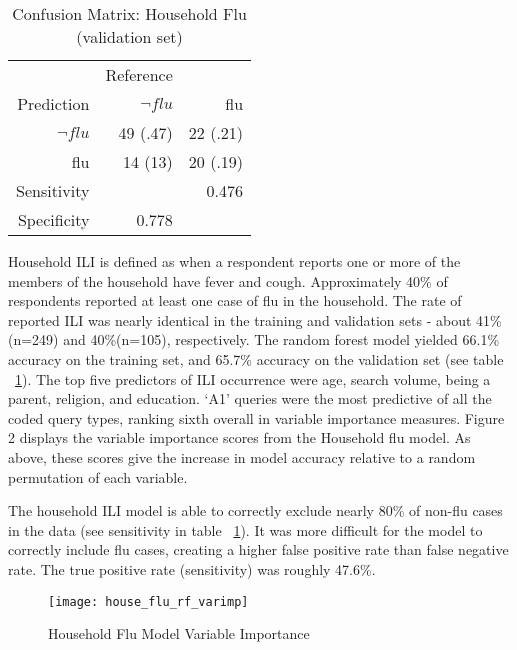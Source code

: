\documentclass[12pt]{article}
\begin{document}
\begin{table}[!htbp]
\centering
  \caption{Confusion Matrix: Household Flu (validation set)}
  \label{classif1}
\begin{tabular}{rrr}
  \hline
    & Reference &   \\
Prediction    &      $\neg{flu}$  &  flu\\
                $\neg{flu}$ & 49 (.47)  & 22 (.21)  \\
                          flu & 14 (13)  &  20 (.19) \\
   \hline
   Sensitivity &   &  0.476 \\
   Specificity & 0.778  &   \\
   \hline
\end{tabular}
\end{table}


Household ILI is defined as when a respondent reports one or more of the members of the household have fever and cough. Approximately 40\% of respondents reported at least one case of flu in the household. The rate of reported ILI was nearly identical in the training and validation sets - about 41\% (n=249) and 40\%(n=105), respectively. The random forest model yielded 66.1\% accuracy on the training set, and 65.7\% accuracy on the validation set (see table ~\ref{classif1}). The top five predictors of ILI occurrence were age, search volume, being a parent, religion, and education. `A1' queries were the most predictive of all the coded query types, ranking sixth overall in variable importance measures. Figure 2 displays the variable importance scores from the Household flu model. As above, these scores give the increase in model accuracy relative to a random permutation of each variable.

The household ILI model is able to correctly exclude nearly 80\% of non-flu cases in the data (see sensitivity in table ~\ref{classif1}). It was more difficult for the model to correctly include flu cases, creating a higher false positive rate than false negative rate. The true positive rate (sensitivity) was roughly 47.6\%.

\begin{figure}[!htbp]
\begin{centering}
   \texttt{[image: house\_flu\_rf\_varimp]}
  \caption{Household Flu Model Variable Importance}
\label{house_rf}
\end{centering}
\end{figure}

\clearpage
\end{document}
